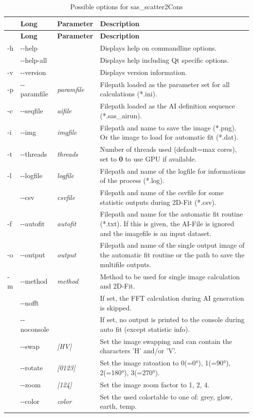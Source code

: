 \documentclass[11pt]{article} %
\begin{document}
\begin{longtable}{|L{1cm}|L{2cm}|C{2cm}|L{12cm}|}
\caption{Possible options for sas\_scatter2Cons} \\
\hline{} & {\bf Long} & {\bf Parameter} & {\bf Description} \\
\endfirsthead
\hline{} & {\bf Long} & {\bf Parameter} & {\bf Description} \\
\endhead
\hline
-h & -{}-help & & Displays help on commandline options. \\ \hline
 & -{}-help-all & & Displays help including Qt specific options. \\ \hline
-v & -{}-version & & Displays version information. \\ \hline
-p & -{}-paramfile & {\it paramfile} & Filepath loaded as the parameter set for all calculations (*.ini). \\ \hline
-c & -{}-seqfile & {\it aifile} & Filepath loaded as the AI definition sequence (*.sas\_airun). \\ \hline
-i & -{}-img & {\it imgfile} & Filepath and name to save the image (*.png). Or the image to load for automatic fit (*.dat). \\ \hline
-t & -{}-threads & {\it threads} & Number of threads used (default=max cores), set to {\bf 0} to use GPU if available. \\ \hline
-l & -{}-logfile & {\it logfile} & Filepath and name of the logfile for informations of the process (*.log). \\ \hline
 & -{}-csv & {\it csvfile} & Filepath and name of the csvfile for some statistic outputs during 2D-Fit (*.csv). \\ \hline
-f & -{}-autofit & {\it autofit} & Filepath and name for the automatic fit routine (*.txt). If this is given, the AI-File is ignored and the imagefile is an input dataset. \\ \hline
-o & -{}-output & {\it output} & Filepath and name of the single output image of the automatic fit routine or the path to save the  multifile outputs. \\ \hline
-m & -{}-method & {\it method} & Method to be used for single image calculation and 2D-Fit. \\ \hline
 & -{}-nofft & & If set, the FFT calculation during AI generation is skipped. \\ \hline
 & -{}-noconsole & & If set, no output is printed to the console during auto fit (except statistic info). \\ \hline
 & -{}-swap & {\it [HV]} & Set the image swapping and can contain the characters 'H' and/or 'V'. \\ \hline
 & -{}-rotate & {\it [0123]} & Set the image ratoation to 0(=0°), 1(=90°), 2(=180°), 3(=270°). \\ \hline
 & -{}-zoom & {\it [124]} & Set the image zoom factor to 1, 2, 4. \\ \hline
 & -{}-color & {\it color} & Set the used colortable to one of: grey, glow, earth, temp. \\ \hline
\end{longtable}
\end{document}
